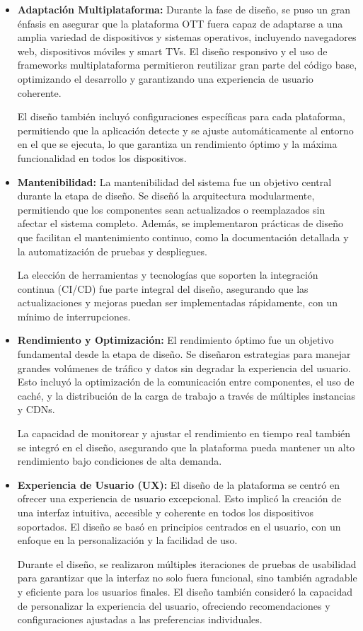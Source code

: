 \begin{itemize}
    \item \textbf{Adaptación Multiplataforma:} Durante la fase de diseño, se puso un gran énfasis en asegurar que la 
    plataforma OTT fuera capaz de adaptarse a una amplia variedad de dispositivos y sistemas operativos, incluyendo navegadores 
    web, dispositivos móviles y smart TVs. El diseño responsivo y el uso de frameworks multiplataforma permitieron reutilizar 
    gran parte del código base, optimizando el desarrollo y garantizando una experiencia de usuario coherente.

    El diseño también incluyó configuraciones específicas para cada plataforma, permitiendo que la aplicación detecte y se 
    ajuste automáticamente al entorno en el que se ejecuta, lo que garantiza un rendimiento óptimo y la máxima funcionalidad 
    en todos los dispositivos.

    \item \textbf{Mantenibilidad:} La mantenibilidad del sistema fue un objetivo central durante la etapa de diseño. Se 
    diseñó la arquitectura modularmente, permitiendo que los componentes sean actualizados o reemplazados sin afectar el 
    sistema completo. Además, se implementaron prácticas de diseño que facilitan el mantenimiento continuo, como la documentación 
    detallada y la automatización de pruebas y despliegues.

    La elección de herramientas y tecnologías que soporten la integración continua (CI/CD) fue parte integral del diseño, 
    asegurando que las actualizaciones y mejoras puedan ser implementadas rápidamente, con un mínimo de interrupciones.

    \item \textbf{Rendimiento y Optimización:} El rendimiento óptimo fue un objetivo fundamental desde la etapa de diseño. Se 
    diseñaron estrategias para manejar grandes volúmenes de tráfico y datos sin degradar la experiencia del usuario. Esto incluyó 
    la optimización de la comunicación entre componentes, el uso de caché, y la distribución de la carga de trabajo a través de 
    múltiples instancias y CDNs.

    La capacidad de monitorear y ajustar el rendimiento en tiempo real también se integró en el diseño, asegurando que la 
    plataforma pueda mantener un alto rendimiento bajo condiciones de alta demanda.

    \item \textbf{Experiencia de Usuario (UX):} El diseño de la plataforma se centró en ofrecer una experiencia de 
    usuario excepcional. Esto implicó la creación de una interfaz intuitiva, accesible y coherente en todos los 
    dispositivos soportados. El diseño se basó en principios centrados en el usuario, con un enfoque en la personalización y la facilidad de uso.

    Durante el diseño, se realizaron múltiples iteraciones de pruebas de usabilidad para garantizar que la interfaz 
    no solo fuera funcional, sino también agradable y eficiente para los usuarios finales. El diseño también consideró la 
    capacidad de personalizar la experiencia del usuario, ofreciendo recomendaciones y configuraciones ajustadas a las preferencias individuales.
\end{itemize}
